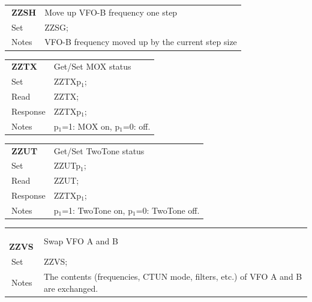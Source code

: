 \documentclass[12pt]{book}
\begin{document}
\begin{center}
\begin{tabular}{|p{2cm}|p{11cm}|}
\toprule
$\phantom{\Big|}$\textbf{\large ZZSH} & Move up VFO-B frequency one step \\\cline{1-2}
$\phantom{\Big|}${\large Set} & {ZZSG;} \\\hline
$\phantom{\Big|}${\large Notes} & \multicolumn{1}{|p{11cm}|}{VFO-B frequency moved up by the current step size} \\
\bottomrule
\end{tabular}
\end{center}

\begin{center}
\begin{tabular}{|p{2cm}|p{11cm}|}
\toprule
$\phantom{\Big|}$\textbf{\large ZZTX} & Get/Set MOX status \\\cline{1-2}
$\phantom{\Big|}${\large Set} & {ZZTXp$_1$;} \\\hline
$\phantom{\Big|}${\large Read} & {ZZTX;} \\\hline
$\phantom{\Big|}${\large Response} & {ZZTXp$_1$;} \\\hline
$\phantom{\Big|}${\large Notes} & \multicolumn{1}{|p{11cm}|}{p$_1$=1: MOX on, p$_1$=0: off.} \\
\bottomrule
\end{tabular}
\end{center}

\begin{center}
\begin{tabular}{|p{2cm}|p{11cm}|}
\toprule
$\phantom{\Big|}$\textbf{\large ZZUT} & Get/Set TwoTone status \\\cline{1-2}
$\phantom{\Big|}${\large Set} & {ZZUTp$_1$;} \\\hline
$\phantom{\Big|}${\large Read} & {ZZUT;} \\\hline
$\phantom{\Big|}${\large Response} & {ZZTXp$_1$;} \\\hline
$\phantom{\Big|}${\large Notes} & \multicolumn{1}{|p{11cm}|}{p$_1$=1: TwoTone on, p$_1$=0: TwoTone off.} \\
\bottomrule
\end{tabular}
\end{center}

\begin{center}
\begin{tabular}{|p{2cm}|p{11cm}|}
\toprule
$\phantom{\Big|}$\textbf{\large ZZVS} & Swap VFO A and B \\\cline{1-2}
$\phantom{\Big|}${\large Set} & {ZZVS;} \\\hline
$\phantom{\Big|}${\large Notes} & \multicolumn{1}{|p{11cm}|}{The contents (frequencies, CTUN mode, filters, etc.) of VFO A and B are exchanged.} \\
\bottomrule
\end{tabular}
\end{center}
\end{document}
